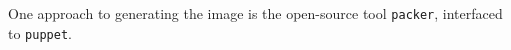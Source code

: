 
One approach to generating the image is the open-source tool
\texttt{packer}\cite{packer}, interfaced to \texttt{puppet}\cite{puppet}.

